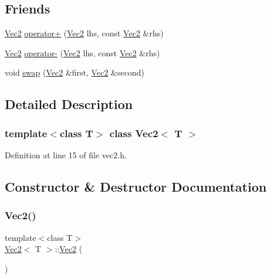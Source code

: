 \subsection*{Friends}
\begin{DoxyCompactItemize}
\item 
\mbox{\hyperlink{class_vec2}{Vec2}} \mbox{\hyperlink{class_vec2_afb88cb74017eda350b931e105cec40a7}{operator+}} (\mbox{\hyperlink{class_vec2}{Vec2}} lhs, const \mbox{\hyperlink{class_vec2}{Vec2}} \&rhs)
\item 
\mbox{\hyperlink{class_vec2}{Vec2}} \mbox{\hyperlink{class_vec2_a44113a615ad1789757d4ac6abca8cb16}{operator-\/}} (\mbox{\hyperlink{class_vec2}{Vec2}} lhs, const \mbox{\hyperlink{class_vec2}{Vec2}} \&rhs)
\item 
void \mbox{\hyperlink{class_vec2_a2d034101022deefa40f69318c0c9af22}{swap}} (\mbox{\hyperlink{class_vec2}{Vec2}} \&first, \mbox{\hyperlink{class_vec2}{Vec2}} \&second)
\end{DoxyCompactItemize}


\subsection{Detailed Description}
\subsubsection*{template$<$class T$>$\newline
class Vec2$<$ T $>$}



Definition at line 15 of file vec2.\+h.



\subsection{Constructor \& Destructor Documentation}
\mbox{\label{class_vec2_a0d51ef92a3baedc006bca6a702cefc65}} 
\subsubsection{\texorpdfstring{Vec2()}{Vec2()}\hspace{0.1cm}{\footnotesize\ttfamily [1/5]}}
{\footnotesize\ttfamily template$<$class T$>$ \\
\mbox{\hyperlink{class_vec2}{Vec2}}$<$ T $>$\+::\mbox{\hyperlink{class_vec2}{Vec2}} (\begin{DoxyParamCaption}{ }\end{DoxyParamCaption})\hspace{0.3cm}{\ttfamily [inline]}}



